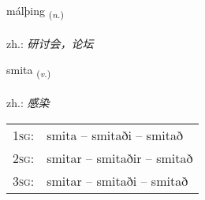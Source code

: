 \documentclass[frontgrid, backgrid]{flacards}\usepackage[]{graphicx}\usepackage[]{xcolor}
\begin{document}
\renewcommand{\flhead}{\vskip5pt \fboxsep=0pt {\small\bfseries\footnotesize Nafnorð | 名词}}
\renewcommand{\fcfoot}{\vskip5pt \fboxsep=0pt \hspace{2pt}{\small\bfseries\footnotesize 3K}}

\renewcommand{\blhead}{\vskip5pt {\small\bfseries\footnotesize Nafnorð | 名词 }}
\renewcommand{\bcfoot}{\vskip5pt \hspace{2pt}{\small\bfseries\footnotesize 3K}}


{málþing \small{\textsubscript{(\textit{n.})}} \\[1ex] %
\textphonetic{[maulθiŋk]} \\
zh.: \emph{研讨会，论坛} \\  [2ex]
\renewcommand*{\arraystretch}{0.8}
}

\renewcommand{\flhead}{\vskip5pt \fboxsep=0pt {\small\bfseries\footnotesize Sagnorð | 动词}}
\renewcommand{\fcfoot}{\vskip5pt \fboxsep=0pt \hspace{2pt}{\small\bfseries\footnotesize 3K}}

\renewcommand{\blhead}{\vskip5pt {\small\bfseries\footnotesize Sagnorð | 动词 }}
\renewcommand{\bcfoot}{\vskip5pt \hspace{2pt}{\small\bfseries\footnotesize 3K}}


{smita \small{\textsubscript{(\textit{v.})}} \\[1ex] %
\textphonetic{[smɪːta]} \\
zh.: \emph{感染} \\  [2ex]
\renewcommand*{\arraystretch}{0.8}
\begin{tabular}{p{1cm}l}
\textsc{1sg}: & smita -- smitaði -- smitað \\ 
\textsc{2sg}: & smitar -- smitaðir -- smitað \\ 
\textsc{3sg}: & smitar -- smitaði -- smitað \\ 
\end{tabular}
}
\end{document}
